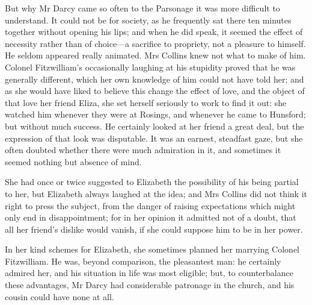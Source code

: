 But why Mr Darcy came so often to the Parsonage it was more difficult to understand. It could not be for society, as he frequently sat there ten minutes together without opening his lips; and when he did speak, it seemed the effect of necessity rather than of choice—a sacrifice to propriety, not a pleasure to himself. He seldom appeared really animated. Mrs Collins knew not what to make of him. Colonel Fitzwilliam's occasionally laughing at his stupidity proved that he was generally different, which her own knowledge of him could not have told her; and as she would have liked to believe this change the effect of love, and the object of that love her friend Eliza, she set herself seriously to work to find it out: she watched him whenever they were at Rosings, and whenever he came to Hunsford; but without much success. He certainly looked at her friend a great deal, but the expression of that look was disputable. It was an earnest, steadfast gaze, but she often doubted whether there were much admiration in it, and sometimes it seemed nothing but absence of mind.

She had once or twice suggested to Elizabeth the possibility of his being partial to her, but Elizabeth always laughed at the idea; and Mrs Collins did not think it right to press the subject, from the danger of raising expectations which might only end in disappointment; for in her opinion it admitted not of a doubt, that all her friend's dislike would vanish, if she could suppose him to be in her power.

In her kind schemes for Elizabeth, she sometimes planned her marrying Colonel Fitzwilliam. He was, beyond comparison, the pleasantest man: he certainly admired her, and his situation in life was most eligible; but, to counterbalance these advantages, Mr Darcy had considerable patronage in the church, and his cousin could have none at all.